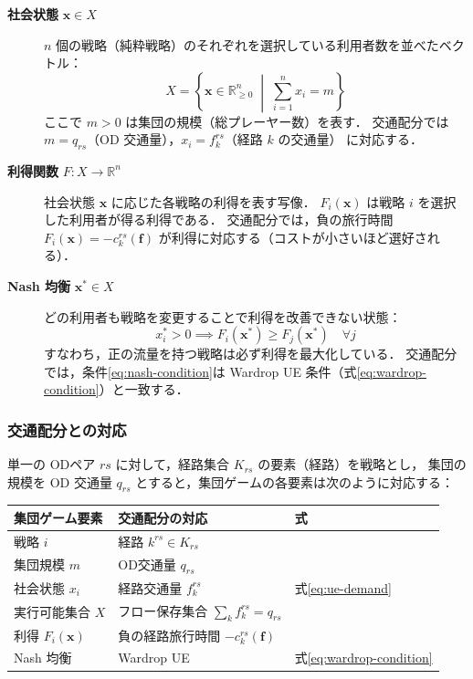 \begin{description}
  \item[\textbf{社会状態} $\boldsymbol{x} \in X$]
    $n$ 個の戦略（純粋戦略）のそれぞれを選択している利用者数を並べたベクトル：
    \begin{equation}
      X = \left\{
        \boldsymbol{x} \in \mathbb{R}^n_{\geq 0}
        \;\middle|\;
        \sum_{i=1}^{n} x_i = m
      \right\}
      \label{eq:social-state-set}
    \end{equation}
    ここで $m > 0$ は集団の規模（総プレーヤー数）を表す．
    交通配分では $m = q_{rs}$（OD 交通量），$x_i = f_k^{rs}$（経路 $k$ の交通量）
    に対応する．

  \item[\textbf{利得関数} $F\colon X \to \mathbb{R}^n$]
    社会状態 $\boldsymbol{x}$ に応じた各戦略の利得を表す写像．
    $F_i(\boldsymbol{x})$ は戦略 $i$ を選択した利用者が得る利得である．
    交通配分では，負の旅行時間 $F_i(\boldsymbol{x}) = -c_k^{rs}(\boldsymbol{f})$
    が利得に対応する（コストが小さいほど選好される）．

  \item[\textbf{Nash 均衡} $\boldsymbol{x}^* \in X$]
    どの利用者も戦略を変更することで利得を改善できない状態：
    \begin{equation}
      x_i^* > 0
      \implies
      F_i(\boldsymbol{x}^*) \geq F_j(\boldsymbol{x}^*)
      \quad \forall j
      \label{eq:nash-condition}
    \end{equation}
    すなわち，正の流量を持つ戦略は必ず利得を最大化している．
    交通配分では，条件\eqref{eq:nash-condition}は
    Wardrop UE 条件（式\eqref{eq:wardrop-condition}）と一致する．
\end{description}

\subsubsection*{交通配分との対応}

単一の ODペア $rs$ に対して，経路集合 $K_{rs}$ の要素（経路）を戦略とし，
集団の規模を OD 交通量 $q_{rs}$ とすると，集団ゲームの各要素は次のように対応する：

\begin{center}
  \begin{tabular}{lll}
    \toprule
    集団ゲーム要素 & 交通配分の対応 & 式 \\
    \midrule
    戦略 $i$ & 経路 $k^{rs} \in K_{rs}$ & \\
    集団規模 $m$ & OD交通量 $q_{rs}$ & \\
    社会状態 $x_i$ & 経路交通量 $f_k^{rs}$ & 式\eqref{eq:ue-demand} \\
    実行可能集合 $X$ & フロー保存集合 $\sum_k f_k^{rs}=q_{rs}$ & \\
    利得 $F_i(\boldsymbol{x})$ & 負の経路旅行時間 $-c_k^{rs}(\boldsymbol{f})$ & \\
    Nash 均衡 & Wardrop UE & 式\eqref{eq:wardrop-condition} \\
    \bottomrule
  \end{tabular}
\end{center}

